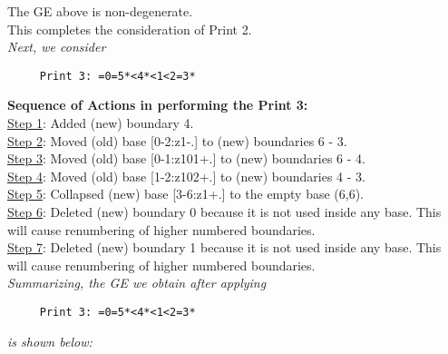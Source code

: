 \documentclass[final]{article}
\begin{document}
The GE above is non-degenerate.\\[0.1in]
This completes the consideration of Print 2.\\[0.1in]
{\em Next, we consider}
\begin{verbatim}
     Print 3: =0=5*<4*<1<2=3*
\end{verbatim}
{\bf Sequence of Actions in performing the Print 3:}\\
{\underline{Step 1}:} Added (new) boundary 4.\\
{\underline{Step 2}:} Moved (old) base [0-2:z1-.]  to (new) boundaries 6 - 3.\\
{\underline{Step 3}:} Moved (old) base [0-1:z101+.]  to (new) boundaries 6 - 4.\\
{\underline{Step 4}:} Moved (old) base [1-2:z102+.]  to (new) boundaries 4 - 3.\\
{\underline{Step 5}:} Collapsed (new) base [3-6:z1+.]  to the empty base (6,6).
\\
{\underline{Step 6}:} Deleted (new) boundary 0 because it is not used inside any base.  This will cause renumbering of higher numbered boundaries.
\\
{\underline{Step 7}:} Deleted (new) boundary 1 because it is not used inside any base.  This will cause renumbering of higher numbered boundaries.
\\[0.1in]
{\em Summarizing, the GE we obtain after applying}
\begin{verbatim}
     Print 3: =0=5*<4*<1<2=3*
\end{verbatim}
{\em is shown below:}
\end{document}
